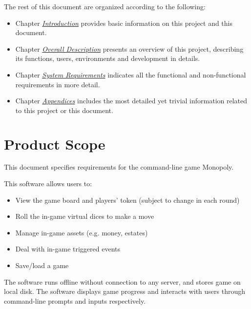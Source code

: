 The rest of this document are organized according to the following:
\begin{itemize}
  \item Chapter \textit{\hyperref[ch:intro]{Introduction}} provides basic information on this project and this document.
  \item Chapter \textit{\hyperref[ch:overall-desc]{Overall Description}} presents an overview of this project, describing its functions, users, environments and development in details.
  \item Chapter \textit{\hyperref[ch:sys-req]{System Requirements}} indicates all the functional and non-functional requirements in more detail.
  \item Chapter \textit{\hyperref[ch:apdx]{Appendices}} includes the most detailed yet trivial information related to this project or this document.
\end{itemize}


\section{Product Scope}

This document specifies requirements for the command-line game Monopoly. \par

This software allows users to:
\begin{itemize}
  \item View the game board and players' token (subject to change in each round)
  \item Roll the in-game virtual dices to make a move
  \item Manage in-game assets (e.g. money, estates)
  \item Deal with in-game triggered events
  \item Save/load a game
\end{itemize}

The software runs offline without connection to any server, and stores game on local disk. The software displays game progress and interacts with users through command-line prompts and inputs respectively. 


